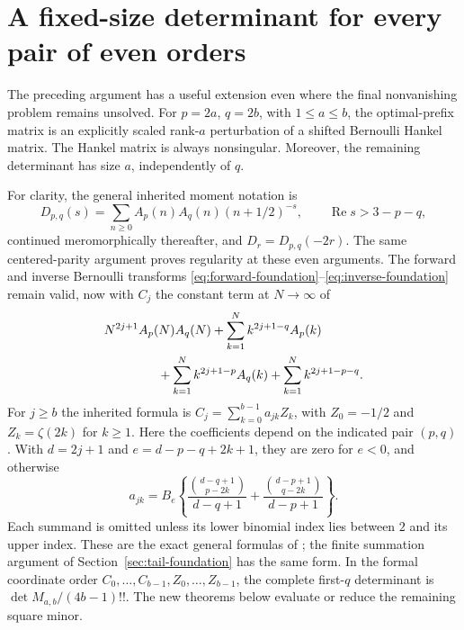 \documentclass[11pt,a4paper]{article}
\numberwithin{equation}{section}
\theoremstyle{plain}
\theoremstyle{definition}
\theoremstyle{remark}
\newcommand{\re}{\operatorname{Re}}
\begin{document}


\section{A fixed-size determinant for every pair of even orders}
\label{sec:general-even-reduction}

The preceding argument has a useful extension even where the final
nonvanishing problem remains unsolved.  For $p=2a$, $q=2b$, with
$1\leq a\leq b$, the optimal-prefix matrix is an explicitly scaled
rank-$a$ perturbation of a shifted Bernoulli Hankel matrix.  The Hankel
matrix is always nonsingular.  Moreover, the remaining determinant
has size $a$, independently of $q$.

For clarity, the general inherited moment notation is
\[
 D_{p,q}(s)=\sum_{n\ge0}A_p(n)A_q(n)(n+1/2)^{-s},
 \qquad \re s>3-p-q,
\]
continued meromorphically thereafter, and $D_r=D_{p,q}(-2r)$.
The same centered-parity argument proves regularity at these even
arguments. The forward and inverse Bernoulli transforms
\eqref{eq:forward-foundation}--\eqref{eq:inverse-foundation} remain valid,
now with $C_j$ the constant term at $N\to\infty$ of
\begin{align*}
 &N^{2j+1}A_p(N)A_q(N)
 +\sum_{k=1}^N k^{2j+1-q}A_p(k)\\
 &\hspace{15mm}
 +\sum_{k=1}^N k^{2j+1-p}A_q(k)
 +\sum_{k=1}^N k^{2j+1-p-q}.
\end{align*}
For $j\ge b$ the inherited formula is
$C_j=\sum_{k=0}^{b-1}a_{jk}Z_k$, with $Z_0=-1/2$ and
$Z_k=\zeta(2k)$ for $k\ge1$. Here the coefficients depend on
the indicated pair $(p,q)$. With $d=2j+1$ and
$e=d-p-q+2k+1$, they are zero for $e<0$, and otherwise
\begin{equation}\label{eq:general-source-entries}
 a_{jk}=B_e\left\{
 \frac{\binom{d-q+1}{p-2k}}{d-q+1}
 +\frac{\binom{d-p+1}{q-2k}}{d-p+1}\right\}.
\end{equation}
Each summand is omitted unless its lower binomial index lies between
$2$ and its upper index. These are the exact general formulas of
\cite[Section 7]{CanonicalFifth}; the finite summation argument of
Section~\ref{sec:tail-foundation} has the same form. In the formal
coordinate order $C_0,\ldots,C_{b-1},Z_0,\ldots,Z_{b-1}$, the
complete first-$q$ determinant is $\det M_{a,b}/(4b-1)!!$.
The new theorems below evaluate or reduce the remaining square minor.
\end{document}
